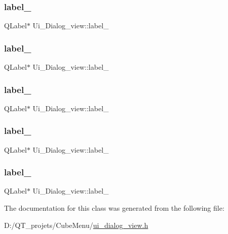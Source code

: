 \subsubsection{\texorpdfstring{label\+\_}{label\_2}}
{\footnotesize\ttfamily Q\+Label$\ast$ Ui\+\_\+\+Dialog\+\_\+view\+::label\+\_}

\hypertarget{class_ui___dialog__view_af3b0c37547a69ec18c44042dd3375891}{}\label{class_ui___dialog__view_af3b0c37547a69ec18c44042dd3375891} 
\subsubsection{\texorpdfstring{label\+\_}{label\_3}}
{\footnotesize\ttfamily Q\+Label$\ast$ Ui\+\_\+\+Dialog\+\_\+view\+::label\+\_}

\hypertarget{class_ui___dialog__view_adaacfa86807c44a8d109094dc59cf9ee}{}\label{class_ui___dialog__view_adaacfa86807c44a8d109094dc59cf9ee} 
\subsubsection{\texorpdfstring{label\+\_}{label\_4}}
{\footnotesize\ttfamily Q\+Label$\ast$ Ui\+\_\+\+Dialog\+\_\+view\+::label\+\_}

\hypertarget{class_ui___dialog__view_abf2ec29f6da83bbac98d9fca33ab3826}{}\label{class_ui___dialog__view_abf2ec29f6da83bbac98d9fca33ab3826} 
\subsubsection{\texorpdfstring{label\+\_}{label\_5}}
{\footnotesize\ttfamily Q\+Label$\ast$ Ui\+\_\+\+Dialog\+\_\+view\+::label\+\_}

\hypertarget{class_ui___dialog__view_ae3bba8bcf5013ea73da92adc6cd9384f}{}\label{class_ui___dialog__view_ae3bba8bcf5013ea73da92adc6cd9384f} 
\subsubsection{\texorpdfstring{label\+\_}{label\_6}}
{\footnotesize\ttfamily Q\+Label$\ast$ Ui\+\_\+\+Dialog\+\_\+view\+::label\+\_}



The documentation for this class was generated from the following file\+:\begin{DoxyCompactItemize}
\item 
D\+:/\+Q\+T\+\_\+projets/\+Cube\+Menu/\hyperlink{ui__dialog__view_8h}{ui\+\_\+dialog\+\_\+view.\+h}\end{DoxyCompactItemize}
